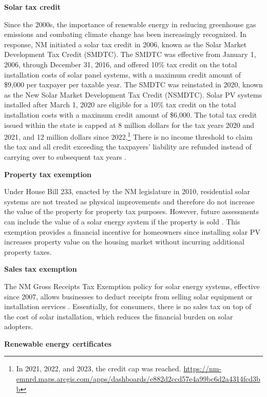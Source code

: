 \documentclass[12pt,twoside,letterpaper]{article}
\begin{document}
\textbf{Solar tax credit}

Since the 2000s, the importance of renewable energy in reducing greenhouse gas emissions and combating climate change has been increasingly recognized. In response, NM initiated a solar tax credit in 2006, known as the Solar Market Development Tax Credit (SMDTC). The SMDTC was effective from January 1, 2006, through December 31, 2016, and offered 10\% tax credit on the total installation costs of solar panel systems, with a maximum credit amount of \$9,000 per taxpayer per taxable year. The SMDTC was reinstated in 2020, known as the New Solar Market Development Tax Credit (NSMDTC). Solar PV systems installed after March 1, 2020 are eligible for a 10\% tax credit on the total installation costs with a maximum credit amount of \$6,000. The total tax credit issued within the state is capped at 8 million dollars for the tax years 2020  and 2021, and 12 million dollars since 2022.\footnote{In 2021, 2022, and 2023, the credit cap was reached. \url{https://nm-emnrd.maps.arcgis.com/apps/dashboards/e882d2ccd57e4a99bc6d2a4314fcd3bb}} There is no income threshold to claim the tax and all credit exceeding the taxpayers' liability are refunded instead of carrying over to subsequent tax years \parencite{nmsmdtc}. 

\noindent\textbf{Property tax exemption}

Under House Bill 233, enacted by the NM legislature in 2010, residential solar systems are not treated as physical improvements and therefore do not increase the value of the property for property tax purposes. However, future assessments can include the value of a solar energy system if the property is sold \parencite{propertytax}. This exemption provides a financial incentive for homeowners since installing solar PV increases property value on the housing market without incurring additional property taxes.


\noindent\textbf{Sales tax exemption}

The NM Gross Receipts Tax Exemption policy for solar energy systems, effective since 2007, allows businesses to deduct receipts from selling solar equipment or installation services \parencite{NMStat2021}. Essentially, for consumers, there is no sales tax on top of the cost of solar installation, which reduces the financial burden on solar adopters.


\noindent\textbf{Renewable energy certificates}
\end{document}
